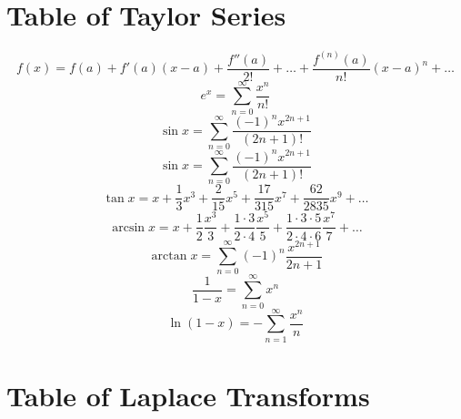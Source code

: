 \documentclass[10pt,driverfallback=hypertex]{report}
\begin{document}
\section{Table of Taylor Series}
\begin{dmath*}
  f(x) = f(a) + f'(a)(x-a) + \frac{f''(a)}{2!} + \dots
  + \frac{f^{(n)}(a)}{n!}(x-a)^n + \dots
\end{dmath*}
\begin{dmath*}
  e^x = \sum_{n=0}^\infty \frac{x^n}{n!}
\end{dmath*}
\begin{dmath*}
  \sin x = \sum_{n=0}^\infty \frac{(-1)^n x^{2n+1}}{(2n+1)!}
\end{dmath*}
\begin{dmath*}
  \sin x = \sum_{n=0}^\infty \frac{(-1)^n x^{2n+1}}{(2n+1)!}
\end{dmath*}
\begin{dmath*}
  \tan x = x + \frac{1}{3}x^3 + \frac{2}{15}x^5 + \frac{17}{315}x^7
  + \frac{62}{2835}x^9 + \dots
\end{dmath*}
\begin{dmath*}
  \arcsin x = x + \frac{1}{2}\frac{x^3}{3}
  + \frac{1\cdot 3}{2\cdot 4}\frac{x^5}{5}
  + \frac{1\cdot3\cdot5}{2\cdot4\cdot6}\frac{x^7}{7} + \dots
\end{dmath*}
\begin{dmath*}
  \arctan x = \sum_{n=0}^\infty (-1)^n \frac{x^{2n+1}}{2n+1}
\end{dmath*}
\begin{dmath*}
  \frac{1}{1-x} = \sum_{n=0}^\infty x^n
\end{dmath*}
\begin{dmath*}
  \ln(1-x) = -\sum_{n=1}^\infty \frac{x^n}{n}
\end{dmath*}

\newpage
\section{Table of Laplace Transforms}
\end{document}
